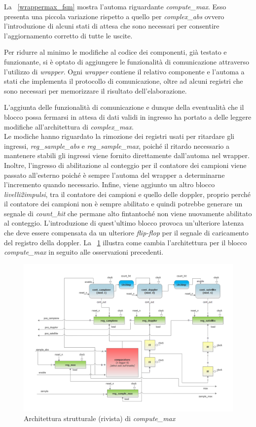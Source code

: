 \documentclass[12pt,a4paper,twoside,openany]{book}
\begin{document}
La \figurename~\ref{wrappermax_fsm} mostra l'automa riguardante \textit{compute\_max}. Esso presenta una piccola variazione rispetto a quello per \textit{complex\_abs} ovvero l'introduzione di alcuni stati di attesa che sono necessari per consentire l'aggiornamento corretto di tutte le uscite.

Per ridurre al minimo le modifiche al codice dei componenti, già testato e funzionante, si è optato di aggiungere le funzionalità di comunicazione attraverso l'utilizzo di \textit{wrapper}. Ogni \textit{wrapper} contiene il relativo componente e l'automa a stati che implementa il protocollo di comunicazione, oltre ad alcuni registri che sono necessari per memorizzare il risultato dell'elaborazione.

L'aggiunta delle funzionalità di comunicazione e dunque della eventualità che il blocco possa fermarsi in attesa di dati validi in ingresso ha portato a delle leggere modifiche all'architettura di \textit{complex\_max}.\\
Le modiche hanno riguardato la rimozione dei registri usati per ritardare gli ingressi, \textit{reg\_sample\_abs} e \textit{reg\_sample\_max}, poiché il ritardo necessario a mantenere stabili gli ingressi viene fornito direttamente dall'automa nel wrapper. Inoltre, l'ingresso di abilitazione al conteggio per il contatore dei campioni viene passato all'esterno poiché è sempre l'automa del wrapper a determinarne l'incremento quando necessario. Infine, viene aggiunto un altro blocco \textit{livelli2impulsi}, tra il contatore dei campioni e quello delle doppler, proprio perché il contatore dei campioni non è sempre abilitato e quindi potrebbe generare un segnale di \textit{count\_hit} che permane alto fintantoché non viene nuovamente abilitato al conteggio. L'introduzione di quest'ultimo blocco provoca un'ulteriore latenza che deve essere compensata da un ulteriore \textit{flip-flop} per il segnale di caricamento del registro della doppler. La \figurename~\ref{computemax_schema2} illustra come cambia l'architettura per il blocco \textit{compute\_max} in seguito alle osservazioni precedenti.

\begin{figure}
\includegraphics[scale=0.55, keepaspectratio]{immagini/computemax_schemablocchi2}
\caption{Architettura strutturale (rivista) di \textit{compute\_max}}
\label{computemax_schema2}
\end{figure}
\end{document}
